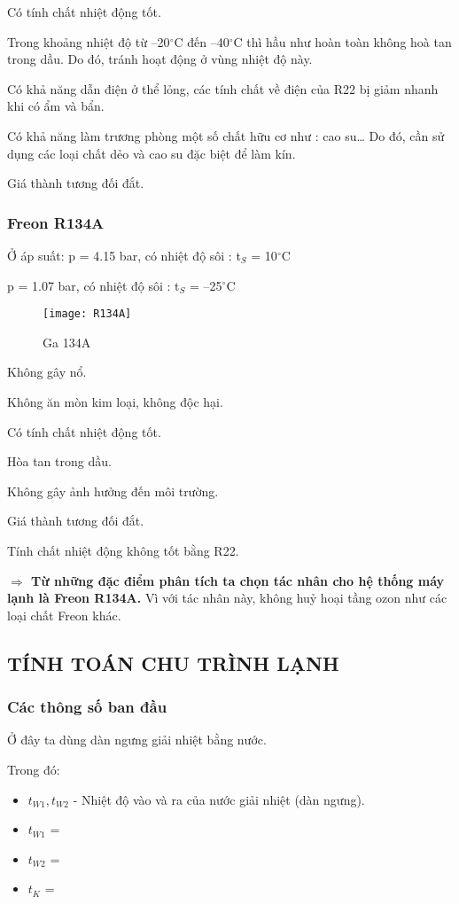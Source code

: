 Có tính chất nhiệt động tốt.

Trong khoảng nhiệt độ từ –20$^{\circ}$C đến –40$^{\circ}$C thì hầu như hoàn toàn không hoà tan trong dầu. Do đó, tránh hoạt động ở vùng nhiệt độ này.

Có khả năng dẫn điện ở thể lỏng, các tính chất về điện của R22 bị giảm nhanh khi có ẩm và bẩn.

Có khả năng làm trương phòng một số chất hữu cơ như : cao su… Do đó, cần sử dụng các loại chất dẻo và cao su đặc biệt để làm kín.

Giá thành tương đối đắt.

\subsubsection{Freon R134A}
Ở áp suất: 
\hspace{1cm}
p = 4.15 bar, có nhiệt độ sôi : t$_{S}$ = 10$^{\circ}$C

\hspace{2.95cm}
p = 1.07 bar, có nhiệt độ sôi : t$_{S}$ = –25$^{\circ}$C
\begin{figure}[H]
	\centering
	\texttt{[image: R134A]}
	\caption{Ga 134A}
\end{figure}

Không gây nổ.

Không ăn mòn kim loại, không độc hại.

Có tính chất nhiệt động tốt.

Hòa tan trong dầu.

Không gây ảnh hưởng đến môi trường.

Giá thành tương đối đắt.

Tính chất nhiệt động không tốt bằng R22.

\textbf{$\Rightarrow$ Từ những đặc điểm phân tích ta chọn tác nhân cho hệ thống máy lạnh là Freon R134A.} Vì với tác nhân này, không huỷ hoại tầng ozon như các loại chất Freon khác.

\subsection{TÍNH TOÁN CHU TRÌNH LẠNH}
\subsubsection{Các thông số ban đầu}
Ở đây ta dùng dàn ngưng giải nhiệt bằng nước.

Trong đó:
\begin{itemize}
	\item $t_{W1}, t_{W2}$ - Nhiệt độ vào và ra của nước giải nhiệt (dàn ngưng).
	\item $t_{W1}$ = 
	\item $t_{W2}$ = 
	\item $t_{K}$ = 
\end{itemize}

